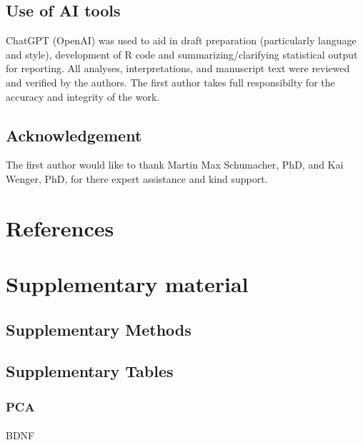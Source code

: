 \documentclass[
  letterpaper,
  DIV=11,
  numbers=noendperiod]{scrartcl}
\makeatletter
\let\oldparagraph\paragraph
\renewcommand{\paragraph}{
    \@ifstar
      \xxxParagraphStar
      \xxxParagraphNoStar
  }
\newcommand{\xxxParagraphStar}[1]{\oldparagraph*{#1}\mbox{}}
\newcommand{\xxxParagraphNoStar}[1]{\oldparagraph{#1}\mbox{}}
\makeatother
\begin{document}
\subsection{Use of AI tools}\label{use-of-ai-tools}

ChatGPT (OpenAI) was used to aid in draft preparation (particularly
language and style), development of R code and summarizing/clarifying
statistical output for reporting. All analyses, interpretations, and
manuscript text were reviewed and verified by the authors. The first
author takes full responsibilty for the accuracy and integrity of the
work.

\subsection{Acknowledgement}\label{acknowledgement}

The first author would like to thank Martin Max Schumacher, PhD, and Kai
Wenger, PhD, for there expert assistance and kind support.

\section{References}\label{references}

\section{Supplementary material}\label{sec-supp}

\subsection{Supplementary Methods}\label{sec-supp-methods}

\subsection{Supplementary Tables}\label{sec-supp-tables}

\subsubsection{PCA}\label{pca}

\paragraph{BDNF}\label{bdnf-1}
\end{document}
